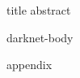 \documentclass[USenglish,oneside,twocolumn]{article}
\begin{document}
{title}
{abstract}

\ifdgruyter
    \maketitle
\fi

{darknet-body}

\newpage

\iflncs
    
    
\fi
\ifdgruyter
    \printbibliography
\fi

\appendix
{appendix}
\end{document}
